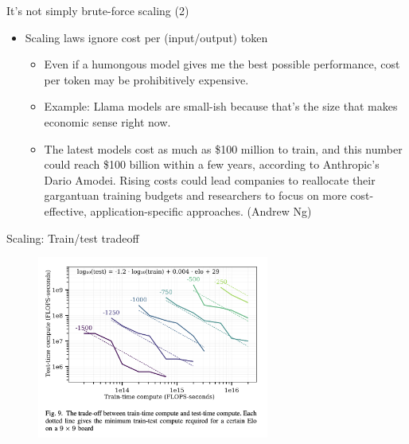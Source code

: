 \begin{vbframe}{It's not simply brute-force scaling (2)}

\vfill

\begin{itemize}
	\item Scaling laws ignore cost per (input/output) token 
	\begin{itemize}
	\item Even if a humongous model gives me the best
	possible performance, cost per token may be
	prohibitively expensive.
        \item Example: Llama models are small-ish because
	that's the size that makes economic sense right now.
        \item The
        latest models cost as much as \$100 million to train,
	and
        this number could reach \$100 billion within a few
	years,
        according to Anthropic’s Dario Amodei. Rising costs
	could
        lead companies to reallocate their gargantuan
	training
        budgets and researchers to focus on more
	cost-effective,
        application-specific approaches. (Andrew Ng)
         
	\end{itemize}

\end{itemize}

\vfill

\end{vbframe}


\begin{vbframe}{Scaling: Train/test tradeoff}

\vfill

\begin{figure}
	\centering
	\includegraphics[height = 6cm]{./figure/scalingtraintest.png} \\ 
\end{figure}

                 
\vfill



\end{vbframe}


